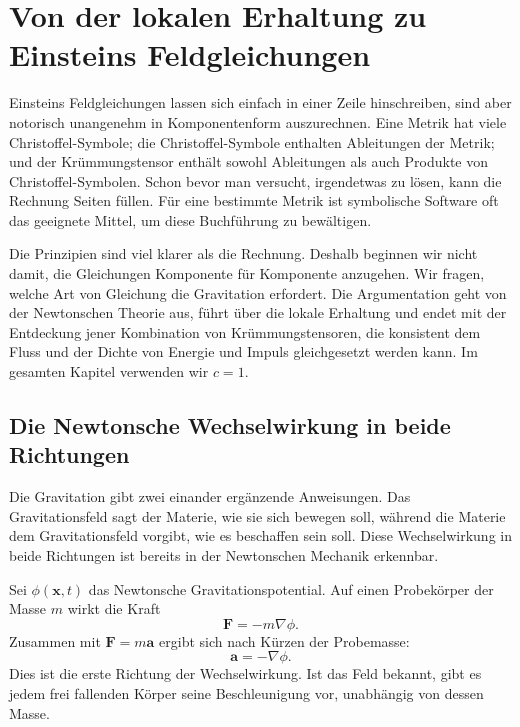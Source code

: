 \chapter{Von der lokalen Erhaltung zu Einsteins Feldgleichungen}

Einsteins Feldgleichungen lassen sich einfach in einer Zeile hinschreiben, sind aber notorisch unangenehm in Komponentenform auszurechnen. Eine Metrik hat viele Christoffel-Symbole; die Christoffel-Symbole enthalten Ableitungen der Metrik; und der Krümmungstensor enthält sowohl Ableitungen als auch Produkte von Christoffel-Symbolen. Schon bevor man versucht, irgendetwas zu lösen, kann die Rechnung Seiten füllen. Für eine bestimmte Metrik ist symbolische Software oft das geeignete Mittel, um diese Buchführung zu bewältigen.

Die Prinzipien sind viel klarer als die Rechnung. Deshalb beginnen wir nicht damit, die Gleichungen Komponente für Komponente anzugehen. Wir fragen, welche Art von Gleichung die Gravitation erfordert. Die Argumentation geht von der Newtonschen Theorie aus, führt über die lokale Erhaltung und endet mit der Entdeckung jener Kombination von Krümmungstensoren, die konsistent dem Fluss und der Dichte von Energie und Impuls gleichgesetzt werden kann. Im gesamten Kapitel verwenden wir \(c=1\).

\section{Die Newtonsche Wechselwirkung in beide Richtungen}

Die Gravitation gibt zwei einander ergänzende Anweisungen. Das Gravitationsfeld sagt der Materie, wie sie sich bewegen soll, während die Materie dem Gravitationsfeld vorgibt, wie es beschaffen sein soll. Diese Wechselwirkung in beide Richtungen ist bereits in der Newtonschen Mechanik erkennbar.

Sei \(\phi(\mathbf{x},t)\) das Newtonsche Gravitationspotential. Auf einen Probekörper der Masse \(m\) wirkt die Kraft
\begin{equation}
 \mathbf{F}=-m\nabla\phi.
\end{equation}
Zusammen mit \(\mathbf{F}=m\mathbf{a}\) ergibt sich nach Kürzen der Probemasse:
\begin{equation}
 \mathbf{a}=-\nabla\phi.
\end{equation}
Dies ist die erste Richtung der Wechselwirkung. Ist das Feld bekannt, gibt es jedem frei fallenden Körper seine Beschleunigung vor, unabhängig von dessen Masse.

